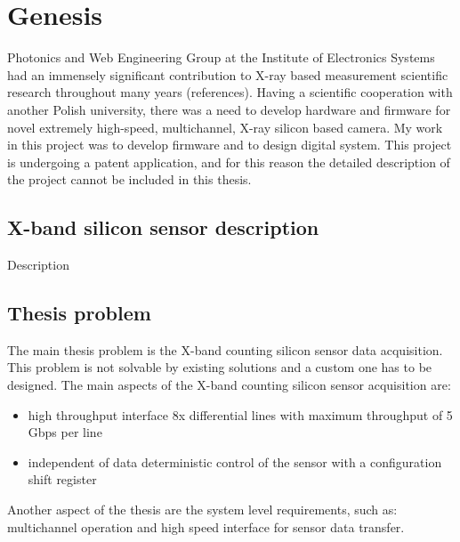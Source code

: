 
\chapter{Genesis}

Photonics and Web Engineering Group at the Institute of Electronics Systems had an immensely significant contribution to
X-ray based measurement scientific research throughout many years (references). %
Having a scientific cooperation with another Polish university, there was a need to develop hardware and firmware for novel extremely high-speed,
multichannel, X-ray silicon based camera. My work in this project was to develop firmware and to design digital system.
This project is undergoing a patent application, and for this reason the detailed description of the project cannot be
included in this thesis. 

\section{X-band silicon sensor description}
Description


\section{Thesis problem}
The main thesis problem is the X-band counting silicon sensor data acquisition. 
This problem is not solvable by existing solutions and a custom one has to be designed. The main aspects of the X-band 
counting silicon sensor acquisition are:
\begin{itemize}
    \item high throughput interface 8x differential lines with maximum throughput of 5 Gbps per line
    \item independent of data deterministic control of the sensor with a configuration shift register
\end{itemize}

Another aspect of the thesis are the system level requirements, such as: multichannel operation and high speed interface
for sensor data transfer. 



